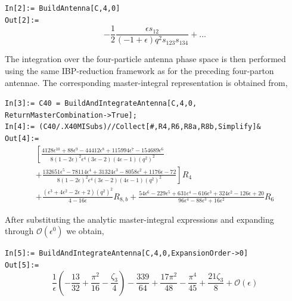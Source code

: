 \begin{mdframed}[backgroundcolor=gray!10, linewidth=0pt]
\texttt{In[2]:= BuildAntenna[C,4,0]}\\
\hfill
\texttt{Out[2]:=}
    \begin{equation*}
        -\frac12\frac{\epsilon s_{12}}{(-1+\epsilon)q^2s_{123}s_{134}}+...
    \end{equation*}
\end{mdframed}

The integration over the four-particle antenna phase space is then performed using the same
IBP-reduction framework as for the preceding four-parton antennae. The corresponding
master-integral representation is obtained from,

\begin{mdframed}[backgroundcolor=gray!10, linewidth=0pt]
\texttt{In[3]:= C40 = BuildAndIntegrateAntenna[C,4,0,\\ReturnMasterCombination->True];}\\
\texttt{In[4]:= (C40/.X40MISubs)//Collect[\#,{R4,R6,R8a,R8b},Simplify]\&}\\
\hfill
\texttt{Out[4]:=}
    \begin{equation*}
        \begin{gathered}
            \left[\frac{4128\epsilon^{10}+88\epsilon^9-44412\epsilon^8+115994\epsilon^7-154689\epsilon^6}{8(1-2\epsilon)^2\epsilon^4(3\epsilon-2)(4\epsilon-1)\left(q^2\right)^2}\right.\\
            \left.+\frac{132651\epsilon^5-78114\epsilon^4+31324\epsilon^3-8058\epsilon^2+1176\epsilon-72}{8(1-2\epsilon)^2\epsilon^4(3\epsilon-2)(4\epsilon-1)\left(q^2\right)^2}\right]R_4\\
            +\frac{\left(\epsilon^3+4\epsilon^2-2\epsilon+2\right)\left(q^2\right)^2}{4-16\epsilon}R_{8,b}
            +\frac{54\epsilon^6-229\epsilon^5+631\epsilon^4-616\epsilon^3+324\epsilon^2-126\epsilon+20}{96\epsilon^4-88\epsilon^3+16\epsilon^2}R_6
        \end{gathered}
    \end{equation*}
\end{mdframed}

After substituting the analytic master-integral expressions and expanding through
$\mathcal O(\epsilon^0)$ we obtain,

\begin{mdframed}[backgroundcolor=gray!10, linewidth=0pt]
\texttt{In[5]:= BuildAndIntegrateAntenna[C,4,0,ExpansionOrder->0]}\\
\hfill
\texttt{Out[5]:=}
    \begin{equation*}
        \frac1\epsilon\!\left(-\frac{13}{32}+\frac{\pi^2}{16}-\frac{\zeta_3}{4}\right)-\frac{339}{64}+\frac{17\pi^2}{48}-\frac{\pi^4}{45}+\frac{21\zeta_3}{8}+\mathcal O(\epsilon)
    \end{equation*}
\end{mdframed}

